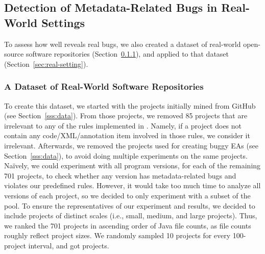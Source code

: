 \subsection{Detection of Metadata-Related Bugs in Real-World Settings}\label{ss:eval-real-world}

To assess how well \tool reveals real bugs, we also created a dataset of \totalRealProject real-world open-source software repositories (Section~\ref{sec:dataset}), and applied \tool to that dataset (Section~\ref{sec:real-setting}). 

\subsubsection{A Dataset of Real-World Software Repositories}\label{sec:dataset}
To create this dataset, we started with the \totalProject projects initially mined from GitHub (see Section~\ref{sss:data}). From those projects, we removed 85 projects that are irrelevant to any of the \totalRule rules implemented in \tool. Namely, if a project does not contain any code/XML/annotation item involved in those rules, we consider it irrelevant. Afterwards, we 
removed the \totalInjection projects used for creating buggy EAs (see Section~\ref{sss:data}), to avoid doing multiple experiments on the same projects.  
{Na\"ively, we could experiment with all program versions{,} for each of the remaining 701 projects, to check whether any version has metadata-related bugs and violates our predefined rules. However, it  would take too much time to analyze all versions of each project,} 
so we decided to only experiment with a subset of the pool.  
To ensure the representatives of our experiment and results, we decided to include projects of distinct scales (i.e., small, medium, and large projects). Thus, we ranked the 701 projects in ascending order of Java file counts, as file counts roughly reflect project sizes. We randomly sampled 10 projects for every 100-project interval, and got \totalRealProject projects. 

